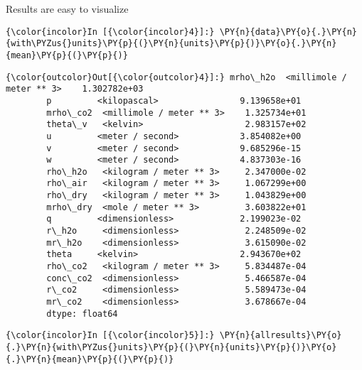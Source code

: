
\begin{exampleblock}{Results are easy to visualize}
    \begin{Verbatim}[commandchars=\\\{\}]
{\color{incolor}In [{\color{incolor}4}]:} \PY{n}{data}\PY{o}{.}\PY{n}{with\PYZus{}units}\PY{p}{(}\PY{n}{units}\PY{p}{)}\PY{o}{.}\PY{n}{mean}\PY{p}{(}\PY{p}{)}
\end{Verbatim}


\begin{Verbatim}[commandchars=\\\{\}]
{\color{outcolor}Out[{\color{outcolor}4}]:} mrho\_h2o  <millimole / meter ** 3>    1.302782e+03
        p         <kilopascal>                9.139658e+01
        mrho\_co2  <millimole / meter ** 3>    1.325734e+01
        theta\_v   <kelvin>                    2.983157e+02
        u         <meter / second>            3.854082e+00
        v         <meter / second>            9.685296e-15
        w         <meter / second>            4.837303e-16
        rho\_h2o   <kilogram / meter ** 3>     2.347000e-02
        rho\_air   <kilogram / meter ** 3>     1.067299e+00
        rho\_dry   <kilogram / meter ** 3>     1.043829e+00
        mrho\_dry  <mole / meter ** 3>         3.603822e+01
        q         <dimensionless>             2.199023e-02
        r\_h2o     <dimensionless>             2.248509e-02
        mr\_h2o    <dimensionless>             3.615090e-02
        theta     <kelvin>                    2.943670e+02
        rho\_co2   <kilogram / meter ** 3>     5.834487e-04
        conc\_co2  <dimensionless>             5.466587e-04
        r\_co2     <dimensionless>             5.589473e-04
        mr\_co2    <dimensionless>             3.678667e-04
        dtype: float64
\end{Verbatim}
            
    \begin{Verbatim}[commandchars=\\\{\}]
{\color{incolor}In [{\color{incolor}5}]:} \PY{n}{allresults}\PY{o}{.}\PY{n}{with\PYZus{}units}\PY{p}{(}\PY{n}{units}\PY{p}{)}\PY{o}{.}\PY{n}{mean}\PY{p}{(}\PY{p}{)}
\end{Verbatim}



\end{exampleblock}
